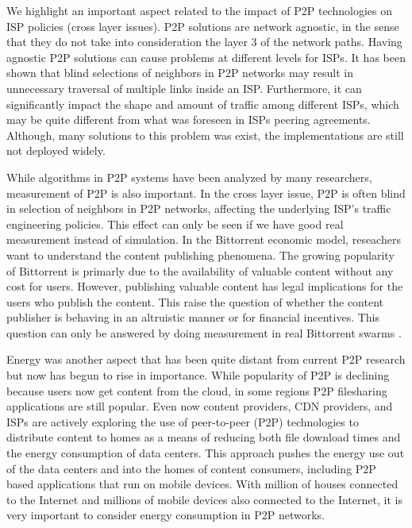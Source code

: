We highlight an important aspect related to the impact of P2P technologies on ISP policies (cross layer issues). 
P2P solutions are network agnostic, in the sense that they do not take into consideration the layer 3 of the network paths. 
Having agnostic P2P solutions can cause problems at different levels for ISPs. 
It has been shown that blind selections of neighbors in P2P networks may result in unnecessary traversal of multiple links inside an ISP. 
Furthermore, it can significantly impact  the shape and amount of traffic among different ISPs, which may be quite different from what was foreseen in ISPs peering agreements.
Although, many solutions to this problem was exist, the implementations are still not deployed widely.  

While algorithms in P2P systems have been analyzed by many researchers, measurement of P2P is also important.
In the cross layer issue, P2P is often blind in selection of neighbors in P2P networks, affecting the underlying ISP's traffic engineering policies.  
This effect can only be seen if we have good real measurement instead of simulation.
In the Bittorrent economic model, reseachers want to understand the content publishing phenomena. 
The growing popularity of Bittorrent is primarly due to the availability of valuable content without any cost for users.
However, publishing valuable content has legal implications for the users who publish the content.
This raise the question of whether the content publisher is behaving in an altruistic manner or for financial incentives. 
This question can only be answered by doing measurement in real Bittorrent swarms \cite{6381497}. 

Energy was another aspect that has been quite distant from current P2P research but now has begun to rise in importance. 
While popularity of P2P is declining because users now get content from the cloud, in some regions P2P filesharing applications are still popular.
Even now content providers, CDN providers, and ISPs are actively exploring the use of peer-to-peer (P2P) technologies to distribute content to homes as a means of reducing both file download times and the energy consumption of data centers. 
This approach pushes the energy use out of the data centers and into the homes of content consumers, including P2P based applications that run on mobile devices.
With million of houses connected to the Internet and millions of mobile devices also connected to the Internet, it is very important to consider energy consumption in P2P networks.


